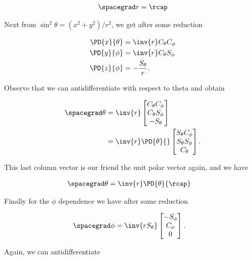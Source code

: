 \begin{align}\label{eqn:jacobianSphericalPolar:11}
\spacegrad r = \rcap
\end{align}

Next from $\sin^2\theta = (x^2 + y^2)/r^2$, we get after some reduction

\begin{subequations}\label{eqn:jacobianSphericalPolar:12}
\begin{align}
\PD{x}{\theta} &= \inv{r} C_\theta C_\phi \\
\PD{y}{\phi} &= \inv{r} C_\theta S_\phi \\
\PD{z}{\phi} &= -\frac{S_\theta}{r}.
\end{align}
\end{subequations}

Observe that we can antidifferentiate with respect to theta and obtain

\begin{align*}
\spacegrad \theta &= 
\inv{r}
\begin{bmatrix}
C_\theta C_\phi \\
C_\theta S_\phi \\
-S_\theta
\end{bmatrix} \\
&=
\inv{r}
\PD{\theta}{}
\begin{bmatrix}
S_\theta C_\phi \\
S_\theta S_\phi \\
C_\theta
\end{bmatrix}.
\end{align*}

This last column vector is our friend the unit polar vector again, and we have

\begin{align}\label{eqn:jacobianSphericalPolar:13}
\spacegrad \theta &= 
\inv{r}
\PD{\theta}{\rcap}
\end{align}

Finally for the $\phi$ dependence we have after some reduction

\begin{align}\label{eqn:jacobianSphericalPolar:14}
\spacegrad \phi &=
\inv{r S_\theta}
\begin{bmatrix}
-S_\phi \\
C_\phi \\
0
\end{bmatrix}.
\end{align}

Again, we can antidifferentiate

